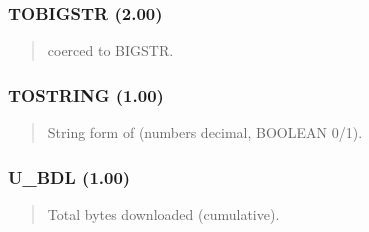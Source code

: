 \documentclass[letterpaper,10pt,english]{sphinxmanual}
\begin{document}
\subsubsection{TOBIGSTR (2.00)}
\label{\detokenize{ppl:tobigstr-2-00}}\begin{quote}

\sphinxAtStartPar
{}
\begin{description}
\sphinxAtStartPar
{} coerced to BIGSTR.

\end{description}
\end{quote}


\subsubsection{TOSTRING (1.00)}
\label{\detokenize{ppl:tostring-1-00}}\begin{quote}

\sphinxAtStartPar
{}
\begin{description}
\sphinxAtStartPar
String form of  (numbers decimal, BOOLEAN 0/1).

\end{description}
\end{quote}


\subsubsection{U\_BDL (1.00)}
\label{\detokenize{ppl:u-bdl-1-00}}\begin{quote}

\sphinxAtStartPar
{}
\begin{description}
\sphinxAtStartPar
Total bytes downloaded (cumulative).

\end{description}
\end{quote}
\end{document}
